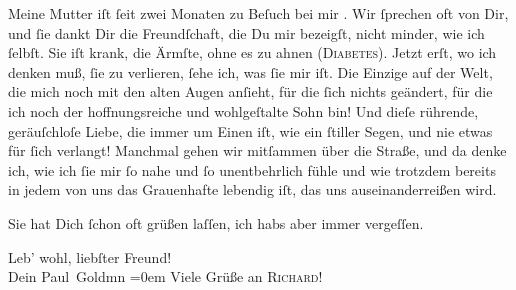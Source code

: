 \pstart
           Meine Mutter iſt ſeit zwei
               Monaten zu Beſuch bei mir . Wir ſprechen oft von
               Dir, und ſie dankt Dir die Freundſchaft, die Du mir bezeigſt, nicht minder, wie ich
               ſelbſt. Sie iſt krank, die Ärmſte, ohne es zu ahnen (\textsc{Diabetes}). Jetzt erſt,
               wo ich denken muß, ſie zu verlieren, ſehe ich, was ſie mir iſt. Die Einzige auf der Welt, die mich noch  mit den alten {\pb}Augen anſieht, für die ſich nichts geändert, für die
               ich noch der hoffnungsreiche und wohlgeſtalte Sohn bin! Und dieſe rührende,
               geräuſchloſe Liebe, die immer um Einen iſt, wie ein ſtiller Segen, und nie etwas für
               ſich verlangt! Manchmal gehen wir mitſammen über die Straße, und da denke ich, wie
                   ich ſie mir ſo nahe und ſo unentbehrlich
               fühle und wie trotzdem bereits in jedem von uns das Grauenhafte lebendig iſt, das uns
               auseinanderreißen wird.\pend
           
\pstart
           Sie hat Dich ſchon oft grüßen laſſen, ich habs aber immer vergeſſen.\pend
           
\pstart
           Leb' wohl, liebſter Freund! {\\[\baselineskip]}Dein \spacefill\mbox{Paul Goldmn}\pend
           \leftskip=0em{}
\pstart
           \noindent{}Viele Grüße an \textsc{Richard}!\pend
           \endnumbering{}  
      